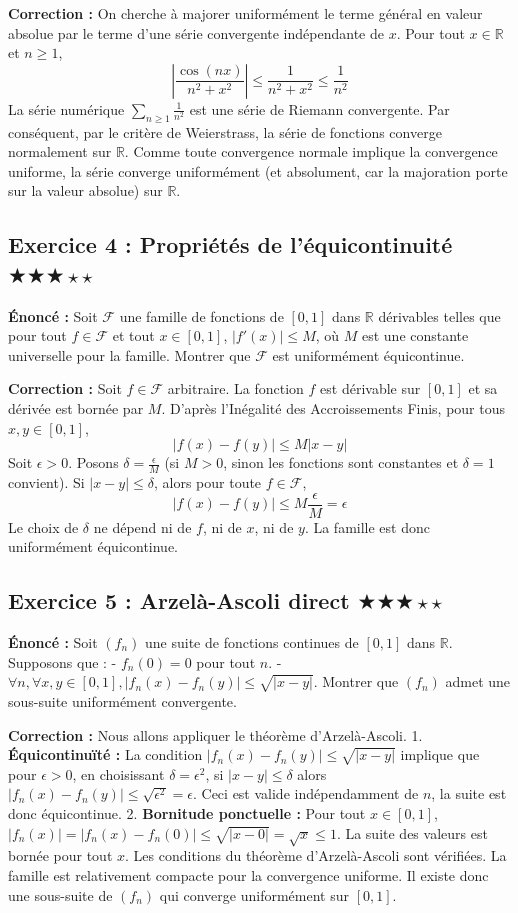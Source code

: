 \documentclass[11pt,a4paper]{article}
\begin{document}
\textbf{Correction :}
On cherche à majorer uniformément le terme général en valeur absolue par le terme d'une série convergente indépendante de $x$.
Pour tout $x \in \mathbb{R}$ et $n \ge 1$,
$$ \left| \frac{\cos(nx)}{n^2 + x^2} \right| \le \frac{1}{n^2 + x^2} \le \frac{1}{n^2} $$
La série numérique $\sum_{n \ge 1} \frac{1}{n^2}$ est une série de Riemann convergente.
Par conséquent, par le critère de Weierstrass, la série de fonctions converge normalement sur $\mathbb{R}$.
Comme toute convergence normale implique la convergence uniforme, la série converge uniformément (et absolument, car la majoration porte sur la valeur absolue) sur $\mathbb{R}$.


\subsection*{Exercice 4 : Propriétés de l'équicontinuité \quad $\bigstar\bigstar\bigstar\star\star$}

\textbf{Énoncé :}
Soit $\mathcal{F}$ une famille de fonctions de $[0, 1]$ dans $\mathbb{R}$ dérivables telles que pour tout $f \in \mathcal{F}$ et tout $x \in [0, 1]$, $|f'(x)| \le M$, où $M$ est une constante universelle pour la famille.
Montrer que $\mathcal{F}$ est uniformément équicontinue.

\textbf{Correction :}
Soit $f \in \mathcal{F}$ arbitraire. La fonction $f$ est dérivable sur $[0, 1]$ et sa dérivée est bornée par $M$.
D'après l'Inégalité des Accroissements Finis, pour tous $x, y \in [0, 1]$,
$$ |f(x) - f(y)| \le M |x - y| $$
Soit $\epsilon > 0$. Posons $\delta = \frac{\epsilon}{M}$ (si $M>0$, sinon les fonctions sont constantes et $\delta=1$ convient).
Si $|x - y| \le \delta$, alors pour toute $f \in \mathcal{F}$,
$$ |f(x) - f(y)| \le M \frac{\epsilon}{M} = \epsilon $$
Le choix de $\delta$ ne dépend ni de $f$, ni de $x$, ni de $y$. La famille est donc uniformément équicontinue.


\subsection*{Exercice 5 : Arzelà-Ascoli direct \quad $\bigstar\bigstar\bigstar\star\star$}

\textbf{Énoncé :}
Soit $(f_n)$ une suite de fonctions continues de $[0, 1]$ dans $\mathbb{R}$. Supposons que :
- $f_n(0) = 0$ pour tout $n$.
- $\forall n, \forall x,y \in [0,1], |f_n(x) - f_n(y)| \le \sqrt{|x-y|}$.
Montrer que $(f_n)$ admet une sous-suite uniformément convergente.

\textbf{Correction :}
Nous allons appliquer le théorème d'Arzelà-Ascoli.
1. \textbf{Équicontinuïté :} La condition $|f_n(x) - f_n(y)| \le \sqrt{|x-y|}$ implique que pour $\epsilon > 0$, en choisissant $\delta = \epsilon^2$, si $|x-y| \le \delta$ alors $|f_n(x) - f_n(y)| \le \sqrt{\epsilon^2} = \epsilon$. Ceci est valide indépendamment de $n$, la suite est donc équicontinue.
2. \textbf{Bornitude ponctuelle :} Pour tout $x \in [0, 1]$, $|f_n(x)| = |f_n(x) - f_n(0)| \le \sqrt{|x-0|} = \sqrt{x} \le 1$. La suite des valeurs est bornée pour tout $x$.
Les conditions du théorème d'Arzelà-Ascoli sont vérifiées. La famille est relativement compacte pour la convergence uniforme. Il existe donc une sous-suite de $(f_n)$ qui converge uniformément sur $[0, 1]$.
\end{document}
